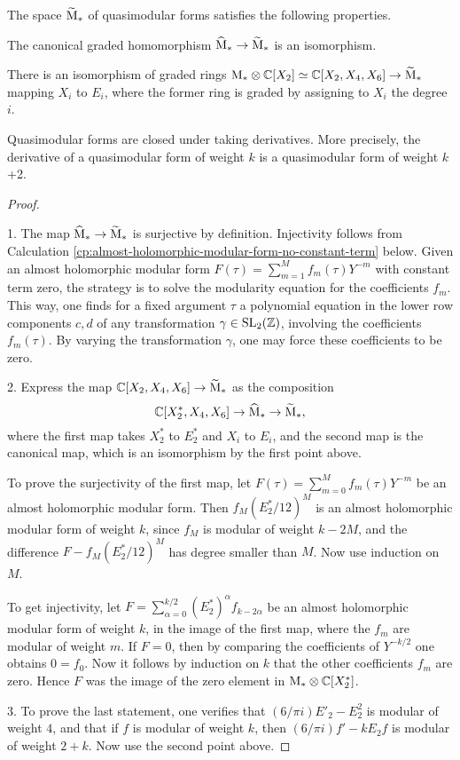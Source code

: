\begin{prop} \label{pr:derivative} The space $\widetilde{\mathrm{M}}_*$ of quasimodular forms satisfies the following properties.

   The canonical graded homomorphism $\widehat{\mathrm{M}}_* \to \widetilde{\mathrm{M}}_*$ is an isomorphism.
  
   There is an isomorphism of graded rings $\mathrm{M}_* \otimes \mathbb{C}[X_2] \simeq \mathbb{C}[X_2, X_4, X_6]\to \widetilde{\mathrm{M}}_*$ mapping $X_i$ to $E_i$, where the former ring is graded by assigning to $X_i$ the degree $i$.
  
   Quasimodular forms are closed under taking derivatives. More precisely, the derivative of a quasimodular form of weight $k$ is a quasimodular form of weight $k$+2.
\end{prop}
\begin{proof}\ 

  1. The map $\widehat{\mathrm{M}}_* \to \widetilde{\mathrm{M}}_*$ is surjective by definition. Injectivity follows from Calculation \ref{cp:almost-holomorphic-modular-form-no-constant-term} below. Given an almost holomorphic modular form $F(\tau)=\sum_{m=1}^Mf_m(\tau)Y^{-m}$ with constant term zero, the strategy is to solve the modularity equation for the coefficients $f_m$. This way, one finds for a fixed argument $\tau$ a polynomial equation in the lower row components  $c,d$ of any transformation $\gamma \in \operatorname{SL}_2(\mathbb{Z})$, involving the coefficients $f_m(\tau)$. By varying the transformation $\gamma$, one may force these coefficients to be zero.
  
  2. Express the map $\mathbb{C}[X_2, X_4, X_6]\to \widetilde{\mathrm{M}}_*$ as the composition \[\mathbb{C}[X^*_2, X_4, X_6]\to \widehat{\mathrm{M}}_* \to \widetilde{\mathrm{M}}_*,\] where the first map takes $X^*_2$ to $E_2^*$ and $X_i$ to $E_i$, and the second map is the canonical map, which is an isomorphism by the first point above.
  
  To prove the surjectivity of the first map, let $F(\tau)=\sum_{m=0}^Mf_m(\tau)Y^{-m}$ be an almost holomorphic modular form. Then $f_M (E_2^*/12)^M$ is an almost holomorphic modular form of weight $k$, since $f_M$ is modular of weight $k-2M$, and the difference $F - f_M (E_2^*/12)^M$ has degree smaller than $M$. Now use induction on $M$.
  
  To get injectivity, let $F=\sum_{\alpha=0}^{k/2}(E_2^*)^\alpha f_{k-2\alpha}$ be an almost holomorphic modular form of weight $k$, in the image of the first map, where the $f_m$ are modular of weight $m$. If $F=0$, then by comparing the coefficients of $Y^{-k/2}$ one obtains $0=f_0$. Now it follows by induction on $k$ that the other coefficients $f_m$ are zero. Hence $F$ was the image of the zero element in $\mathrm{M}_* \otimes \mathbb{C}[X^*_2]$.
  
  3. To prove the last statement, one verifies that $(6/\pi i) E'_2-E_2^2$ is modular of weight $4$, and that if $f$ is modular of weight $k$, then $(6/\pi i)f' - kE_2f$ is modular of weight $2+k$. Now use the second point above.
\end{proof}

